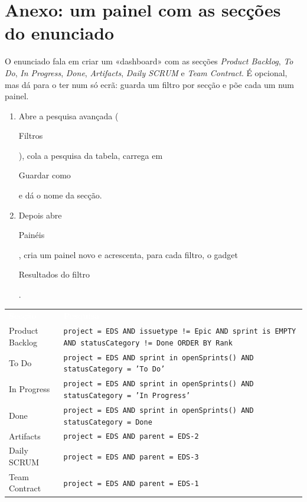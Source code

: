 \documentclass[11pt,a4paper]{article}
\newcommand{\th}[1]{\textcolor{white}{\sffamily\bfseries #1}}
\newcommand{\btn}[1]{{\setlength{\fboxsep}{1.6pt}\colorbox{azulclaro}{\sffamily\small\strut #1}}}
\newcommand{\tabelaini}{\begingroup\small\renewcommand{\arraystretch}{1.45}\rowcolors{2}{azulclaro!55}{white}}
\newcommand{\tabelafim}{\endgroup}
\begin{document}
\section*{Anexo: um painel com as secções do enunciado}

O enunciado fala em criar um «dashboard» com as secções \textit{Product Backlog}, \textit{To Do}, \textit{In Progress}, \textit{Done}, \textit{Artifacts}, \textit{Daily SCRUM} e \textit{Team Contract}. É opcional, mas dá para o ter num só ecrã: guarda um filtro por secção e põe cada um num painel.

\begin{enumerate}
  \item Abre a pesquisa avançada (\btn{Filtros}), cola a pesquisa da tabela, carrega em \btn{Guardar como} e dá o nome da secção.
  \item Depois abre \btn{Painéis}, cria um painel novo e acrescenta, para cada filtro, o gadget \btn{Resultados do filtro}.
\end{enumerate}

\tabelaini
\begin{tabularx}{\textwidth}{N{3.2cm} Y}
   \th{Secção} & \th{Pesquisa} \\
  Product Backlog & \small\texttt{project = EDS AND issuetype != Epic AND sprint is EMPTY AND statusCategory != Done ORDER BY Rank} \\
  To Do & \small\texttt{project = EDS AND sprint in openSprints() AND statusCategory = 'To Do'} \\
  In Progress & \small\texttt{project = EDS AND sprint in openSprints() AND statusCategory = 'In Progress'} \\
  Done & \small\texttt{project = EDS AND sprint in openSprints() AND statusCategory = Done} \\
  Artifacts & \small\texttt{project = EDS AND parent = EDS-2} \\
  Daily SCRUM & \small\texttt{project = EDS AND parent = EDS-3} \\
  Team Contract & \small\texttt{project = EDS AND parent = EDS-1} \\
  \bottomrule
\end{tabularx}
\tabelafim
\end{document}
